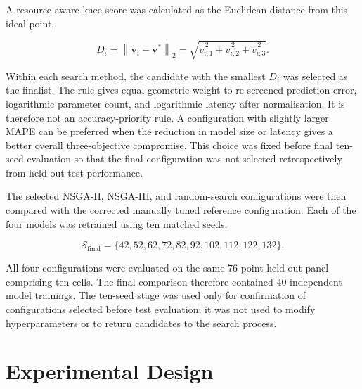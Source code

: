 \documentclass[a4paper,fleqn]{cas-sc}
\begin{document}
A resource-aware knee score was calculated as the Euclidean distance from this ideal point,

\begin{equation}
D_i
=
\left\|
\tilde{\mathbf{v}}_i-\mathbf{v}^{*}
\right\|_2
=
\sqrt{
\tilde{v}_{i,1}^{\,2}
+
\tilde{v}_{i,2}^{\,2}
+
\tilde{v}_{i,3}^{\,2}
}.
\label{eq:knee_distance}
\end{equation}

Within each search method, the candidate with the smallest $D_i$ was selected as the finalist. The rule gives equal geometric weight to re-screened prediction error, logarithmic parameter count, and logarithmic latency after normalisation. It is therefore not an accuracy-priority rule. A configuration with slightly larger MAPE can be preferred when the reduction in model size or latency gives a better overall three-objective compromise. This choice was fixed before final ten-seed evaluation so that the final configuration was not selected retrospectively from held-out test performance.

The selected NSGA-II, NSGA-III, and random-search configurations were then compared with the corrected manually tuned reference configuration. Each of the four models was retrained using ten matched seeds,

\begin{equation}
\mathcal{S}_{\mathrm{final}}
=
\{42,52,62,72,82,92,102,112,122,132\}.
\label{eq:final_seeds}
\end{equation}

All four configurations were evaluated on the same 76-point held-out panel comprising ten cells. The final comparison therefore contained 40 independent model trainings. The ten-seed stage was used only for confirmation of configurations selected before test evaluation; it was not used to modify hyperparameters or to return candidates to the search process.




\section{Experimental Design}
\label{sec:experimental_design}

\end{document}

